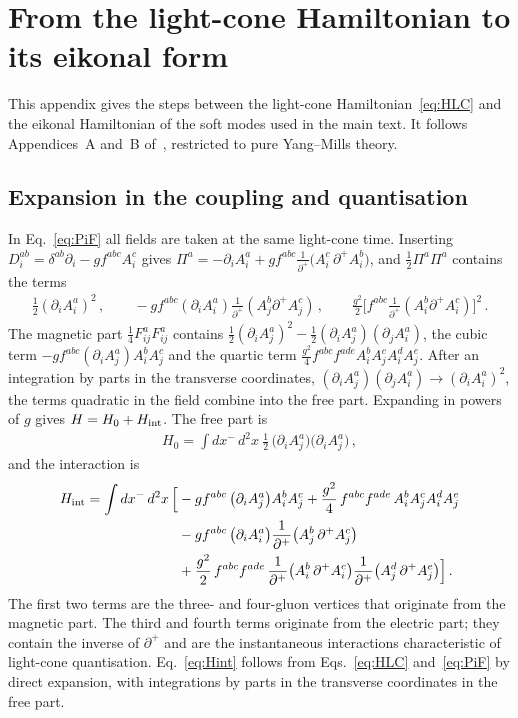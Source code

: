 \section{From the light-cone Hamiltonian to its eikonal form}\label{app:hamiltonian}

This appendix gives the steps between the light-cone Hamiltonian~\eqref{eq:HLC} and the eikonal Hamiltonian of the soft modes used in the main text. It follows Appendices~A and~B of~\cite{Lublinsky:2016meo}, restricted to pure Yang--Mills theory.

\subsection{Expansion in the coupling and quantisation}

In Eq.~\eqref{eq:PiF} all fields are taken at the same light-cone time. Inserting $D^{ab}_i=\delta^{ab}\partial_i-gf^{abc}A^c_i$ gives $\Pi^a=-\partial_iA^a_i+gf^{abc}\frac{1}{\partial^+}\big(A^c_i\,\partial^+A^b_i\big)$, and $\frac12\Pi^a\Pi^a$ contains the terms
\begin{align}
\frac12(\partial_iA^a_i)^2\,,\qquad -gf^{abc}(\partial_iA^a_i)\frac{1}{\partial^+}(A^b_j\partial^+A^c_j)\,,\qquad \frac{g^2}{2}\Big[f^{abc}\frac{1}{\partial^+}(A^b_i\partial^+A^c_i)\Big]^2\,.
\end{align} The magnetic part $\frac14F^a_{ij}F^a_{ij}$ contains $\frac12(\partial_iA^a_j)^2-\frac12(\partial_iA^a_j)(\partial_jA^a_i)$, the cubic term $-gf^{abc}(\partial_iA^a_j)A^b_iA^c_j$ and the quartic term $\frac{g^2}{4}f^{abc}f^{ade}A^b_iA^c_jA^d_iA^e_j$. After an integration by parts in the transverse coordinates, $(\partial_iA^a_j)(\partial_jA^a_i)\to(\partial_iA^a_i)^2$, the terms quadratic in the field combine into the free part. Expanding in powers of $g$ gives $H=H_0+H_{\rm int}$. The free part is
\begin{align}\label{eq:H0x}
H_0=\int dx^-\,d^2x\ \frac12\,\big(\partial_iA^a_j\big)\big(\partial_iA^a_j\big)\,,
\end{align}
and the interaction is
\begin{align}\label{eq:Hint}
H_{\rm int}=\int dx^-\,d^2x\,\Big[&-gf^{abc}\,\big(\partial_iA^a_j\big)A^b_iA^c_j+\frac{g^2}{4}\,f^{abc}f^{ade}\,A^b_iA^c_jA^d_iA^e_j\notag\\
&-gf^{abc}\,\big(\partial_iA^a_i\big)\frac{1}{\partial^+}\big(A^b_j\,\partial^+A^c_j\big)\notag\\
&+\frac{g^2}{2}\,f^{abc}f^{ade}\,\frac{1}{\partial^+}\big(A^b_i\,\partial^+A^c_i\big)\frac{1}{\partial^+}\big(A^d_j\,\partial^+A^e_j\big)\Big]\,.
\end{align}
The first two terms are the three- and four-gluon vertices that originate from the magnetic part. The third and fourth terms originate from the electric part; they contain the inverse of $\partial^+$ and are the instantaneous interactions characteristic of light-cone quantisation. Eq.~\eqref{eq:Hint} follows from Eqs.~\eqref{eq:HLC} and~\eqref{eq:PiF} by direct expansion, with integrations by parts in the transverse coordinates in the free part.

